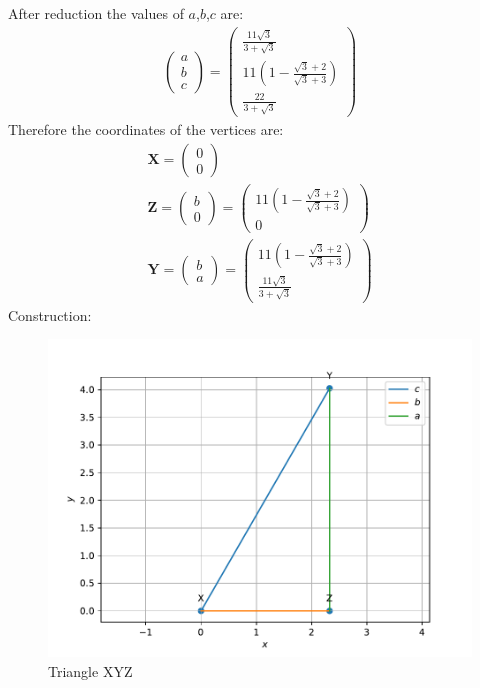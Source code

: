 \documentclass[10pt]{article}
\newcommand{\myvec}[1]{\ensuremath{\begin{pmatrix}#1\end{pmatrix}}}
\let\vec\mathbf{}
\begin{document}
 After reduction the values of $a$,$b$,$c$ are:
 \begin{align}
     \myvec{a \\ b \\ c}=\myvec{\frac{11\sqrt{3}}{3+\sqrt{3}} \\ 11(1-\frac{\sqrt{3}+2}{\sqrt{3}+3}) \\\frac{22}{3+\sqrt{3}}}
 \end{align}
 Therefore the coordinates of the vertices are:
 \begin{align}
      \vec{X}=\myvec{0\\0}\\
      \vec{Z}=\myvec{b \\ 0}=\myvec{11(1-\frac{\sqrt{3}+2}{\sqrt{3}+3}) \\ 0}\\                                               
      \vec{Y}=\myvec{b \\ a}=\myvec{11(1-\frac{\sqrt{3}+2}{\sqrt{3}+3}) \\ \frac{11\sqrt{3}}{3+\sqrt{3}} }
 \end{align}
 Construction:\\
 \begin{figure}[h]
	 \begin{center}
		 \includegraphics[width=\columnwidth]{figs/fig.pdf}
	 \end{center}
	 \caption{Triangle XYZ}
	 \label{fig:Fig1}
 \end{figure}
\end{document}
